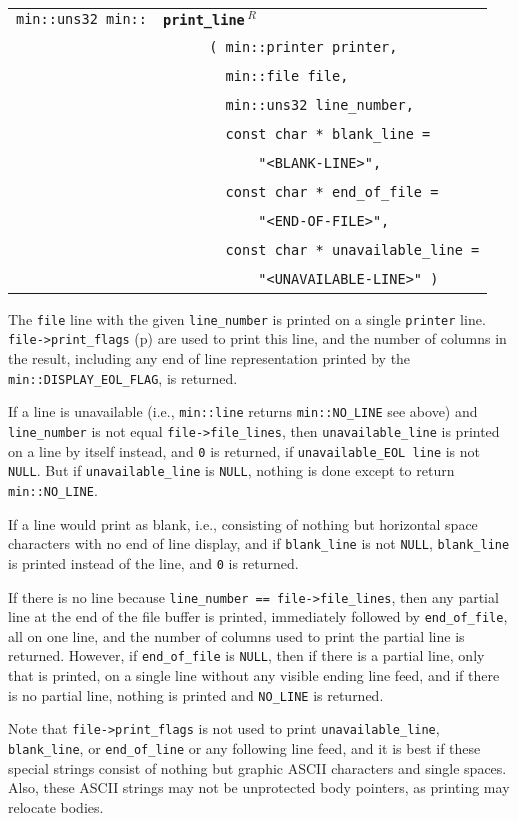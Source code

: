 \documentclass[12pt]{article}
\makeatletter
\newcommand{\ttindex}[1]{\index{#1@{\tt #1}}}
\newcommand{\minindex}[1]{\ttindex{min::#1}\ttindex{#1}}
\newcommand{\pagref}[1]{p\pageref{#1}}
\newcommand{\EOL}{\penalty \exhyphenpenalty}
\newenvironment{indpar}[1][0.3in]%
	{\begin{list}{}%
		     {\setlength{\itemsep}{0in}%
		      \setlength{\topsep}{0in}%
		      \setlength{\parsep}{1ex}%
		      \setlength{\labelwidth}{#1}%
		      \setlength{\leftmargin}{#1}%
		      \addtolength{\leftmargin}{\labelsep}}%
	 \item}%
	{\end{list}}
\newcommand{\LABEL}[1]{\label{#1}}
\newcommand{\ARGBREAK}{\\&{\tt ~~~~}}
\newcommand{\MINKEY}[1]{{\tt \bf #1}\minindex{#1}}
\newcommand{\REL}{$\,^R$}
\makeatother
\begin{document}
\begin{indpar}[1em]\begin{tabular}{r@{}l}
\verb|min::uns32 min::|
    & \MINKEY{print\_\EOL line\REL}\ARGBREAK
      \verb| ( min::printer printer,|\ARGBREAK
      \verb|   min::file file,|\ARGBREAK
      \verb|   min::uns32 line_number,|\ARGBREAK
      \verb|   const char * blank_line =|\ARGBREAK
      \verb|       "<BLANK-LINE>",|\ARGBREAK
      \verb|   const char * end_of_file =|\ARGBREAK
      \verb|       "<END-OF-FILE>",|\ARGBREAK
      \verb|   const char * unavailable_line =|\ARGBREAK
      \verb|       "<UNAVAILABLE-LINE>" )|
\LABEL{MIN::PRINT_LINE} \\
\end{tabular}\end{indpar}

The {\tt file} line with the given {\tt line\_number}
is printed on a single {\tt printer} line.  {\tt file->\EOL print\_\EOL flags}
(\pagref{FILE_PRINT_FLAGS})
are used to print this line, and the number of columns in the result,
including any end of line representation printed by the
{\tt min::\EOL DISPLAY\_\EOL EOL\_\EOL FLAG}, is returned.

If a line is
unavailable (i.e., {\tt min::\EOL line} returns {\tt min::\EOL NO\_\EOL LINE}
see above)
and {\tt line\_\EOL number} is not equal {\tt file->\EOL file\_\EOL lines},
then {\tt unavailable\_\EOL line} is printed on a line by itself instead, and
{\tt 0} is returned, if {\tt unavailable\_EOL line} is not {\tt NULL}.
But if {\tt unavailable\_\EOL line} is {\tt NULL}, nothing is done except
to return {\tt min::\EOL NO\_\EOL LINE}.

If a line would print as blank, i.e., consisting of
nothing but horizontal space characters with no end of line display, and if
{\tt blank\_\EOL line} is not {\tt NULL},
{\tt blank\_\EOL line} is printed instead of the line, and {\tt 0} is returned.

If there is no line
because {\tt line\_\EOL number == file->\EOL file\_\EOL lines},
then any partial line at the end of the file buffer is printed,
immediately followed by {\tt end\_\EOL of\_\EOL file}, all on one line,
and the number of columns used to print the partial line is returned.
However, if {\tt end\_\EOL of\_\EOL file} is {\tt NULL}, then
if there is a partial line, only that is printed, on a single line
without any visible ending line feed, and if there is no partial line,
nothing is printed and {\tt NO\_\EOL LINE} is returned.

Note that
{\tt file->\EOL print\_\EOL flags} is not used to print
{\tt unavailable\_\EOL line}, {\tt blank\_\EOL line}, or
{\tt end\_\EOL of\_\EOL line} or any following line feed,
and it is best if these special strings consist of nothing but
graphic ASCII characters and single spaces.
Also, these ASCII strings may not be unprotected body pointers,
as printing may relocate bodies.
\end{document}
